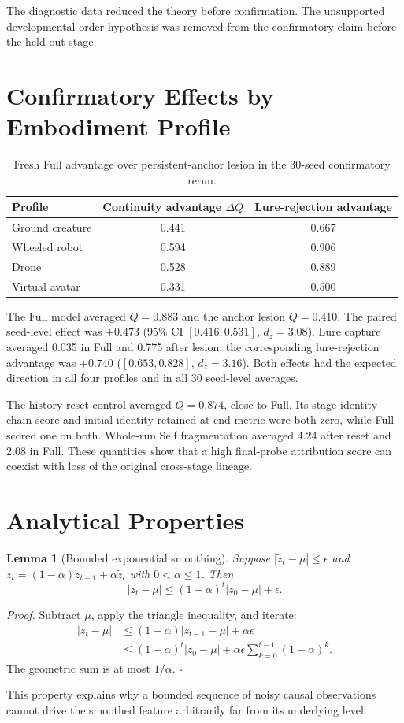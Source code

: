 \documentclass[10pt,journal,onecolumn]{IEEEtran}
\newtheorem{lemma}{Lemma}
\newenvironment{proof}{\par\noindent\textit{Proof.} }{\hfill$\square$\par}
\begin{document}
The diagnostic data reduced the theory before confirmation. The unsupported developmental-order hypothesis was removed from the confirmatory claim before the held-out stage.

\section{Confirmatory Effects by Embodiment Profile}
\begin{table}[h]
\caption{Fresh Full advantage over persistent-anchor lesion in the 30-seed confirmatory rerun.}
\centering
\begin{tabular}{lcc}
\toprule
Profile & Continuity advantage $\Delta Q$ & Lure-rejection advantage \\
\midrule
Ground creature & 0.441 & 0.667 \\
Wheeled robot & 0.594 & 0.906 \\
Drone & 0.528 & 0.889 \\
Virtual avatar & 0.331 & 0.500 \\
\bottomrule
\end{tabular}
\end{table}

The Full model averaged $Q=0.883$ and the anchor lesion $Q=0.410$. The paired seed-level effect was $+0.473$ (95\% CI $[0.416,0.531]$, $d_z=3.08$). Lure capture averaged 0.035 in Full and 0.775 after lesion; the corresponding lure-rejection advantage was $+0.740$ ($[0.653,0.828]$, $d_z=3.16$). Both effects had the expected direction in all four profiles and in all 30 seed-level averages.

The history-reset control averaged $Q=0.874$, close to Full. Its stage identity chain score and initial-identity-retained-at-end metric were both zero, while Full scored one on both. Whole-run Self fragmentation averaged 4.24 after reset and 2.08 in Full. These quantities show that a high final-probe attribution score can coexist with loss of the original cross-stage lineage.

\section{Analytical Properties}
\begin{lemma}[Bounded exponential smoothing]
Suppose $|\tilde z_t-\mu|\le\epsilon$ and $z_t=(1-\alpha)z_{t-1}+\alpha\tilde z_t$ with $0<\alpha\le1$. Then
\begin{equation}
|z_t-\mu|\le(1-\alpha)^t|z_0-\mu|+\epsilon.
\end{equation}
\end{lemma}
\begin{proof}
Subtract $\mu$, apply the triangle inequality, and iterate:
\begin{align*}
|z_t-\mu|&\le(1-\alpha)|z_{t-1}-\mu|+\alpha\epsilon\\
&\le(1-\alpha)^t|z_0-\mu|+\alpha\epsilon\sum_{k=0}^{t-1}(1-\alpha)^k.
\end{align*}
The geometric sum is at most $1/\alpha$.
\end{proof}
This property explains why a bounded sequence of noisy causal observations cannot drive the smoothed feature arbitrarily far from its underlying level.
\end{document}
